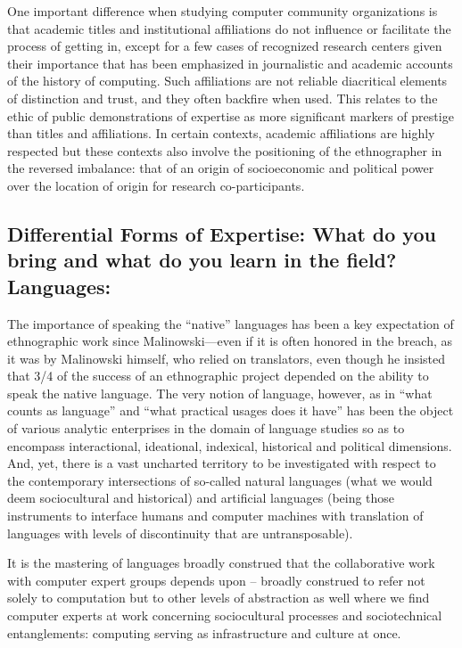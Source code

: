 \documentclass[10pt,letter,oneside]{scrartcl}
\begin{document}
  One important difference when studying computer community
  organizations is that academic titles and institutional affiliations
  do not influence or facilitate the process of getting in, except for
  a few cases of recognized research centers given their importance
  that has been emphasized in journalistic and academic accounts of
  the history of computing. Such affiliations are not reliable
  diacritical elements of distinction and trust, and they often
  backfire when used.  This relates to the ethic of public
  demonstrations of expertise as more significant markers of prestige
  than titles and affiliations. In certain contexts, academic
  affiliations are highly respected but these contexts also involve
  the positioning of the ethnographer in the reversed imbalance: that
  of an origin of socioeconomic and political power over the location
  of origin for research co-participants.

\subsection{Differential Forms of Expertise: What do you bring and what
do you learn in the field? Languages:} 

The importance of speaking the ``native'' languages has been a key
expectation of ethnographic work since Malinowski---even if it is
often honored in the breach, as it was by Malinowski himself, who
relied on translators, even though he insisted that  3/4 of the success of an ethnographic project depended
on the ability to speak the native language.  %
The very notion of language, however, as in ``what counts as
language'' and ``what practical usages does it have'' has been the
object of various analytic enterprises in the domain of language
studies so as to encompass interactional, ideational, indexical,
historical and political dimensions. And, yet, there is a vast
uncharted territory to be investigated with respect to the
contemporary intersections of so-called natural languages (what we
would deem sociocultural and historical) and artificial languages
(being those instruments to interface humans and computer machines
with translation of languages with levels of discontinuity that are
untransposable). 

It is the mastering of languages broadly construed that the
collaborative work with computer expert groups depends upon -- broadly
construed to refer not solely to computation but to other levels of
abstraction as well where we find computer experts at work concerning
sociocultural processes and sociotechnical entanglements: computing
serving as infrastructure and culture at once.  %
\end{document}
